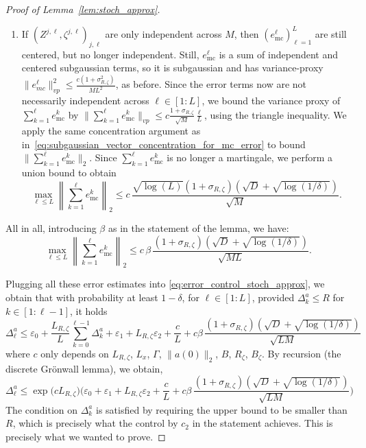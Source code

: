 \documentclass[a4paper,11pt]{article}
\newcommand{\1}{\mathbbm{1}}
\theoremstyle{definition}
\theoremstyle{remark}
\begin{document}
\begin{proof}[Proof of Lemma~\ref{lem:stoch_approx}]
\begin{enumerate}
    \item {If $(Z^{j,\ell}, \zeta^{j,\ell})_{j,\ell}$ are only independent across $M$, then $(e^\ell_{\mathrm{mc}})_{\ell=1}^{L}$ are still centered, but no longer independent.} 
    {Still, $e^\ell_{\mathrm{mc}}$ is a sum of independent and centered subgaussian terms, so it is subgaussian and has variance-proxy $\|e^{\ell}_{mc}\|_{vp}^2 \leq \frac{c(1+\sigma_{R,\zeta}^2)}{ML^2}$, as before. 
    Since the error terms now are not necessarily independent across $\ell\in[1:L]$, we bound the variance proxy of
    $\sum_{k=1}^{\ell} e^k_{\mathrm{mc}}$ by $\|\sum_{k=1}^{\ell} e^k_{\mathrm{mc}} \|_{vp} \leq c\frac{1+\sigma_{R{,\zeta}}}{\sqrt{M}}\frac{\ell}{L}$, using the triangle inequality. We apply the same concentration argument as in~\eqref{eq:subgaussian_vector_concentration_for_mc_error} to bound \(\big\| \sum_{k=1}^{\ell} e^k_{\mathrm{mc}} \big\|_2\). Since $\sum_{k=1}^{\ell} e^k_{\mathrm{mc}}$ is no longer a martingale, we perform a union bound to obtain} 
    \begin{equation}\label{eq:subgaussian_vector_concentration_for_mc_error_shared_in_L}
    \max_{\ell \leq L}\left\| \sum_{k=1}^{\ell} e^k_{\mathrm{mc}} \right\|_2
  \leq c\, \frac{{\sqrt{\log(L)}}(1+\sigma_{R{,\zeta}})(\sqrt{D} + \sqrt{\log(1/\delta)})}{\sqrt{M}}.
\end{equation}
\end{enumerate}
{All in all, introducing $\beta$ as in the statement of the lemma, we have:
\begin{equation}\label{eq:subgaussian_vector_concentration_for_mc_error_all}
    \max_{\ell \leq L}\left\| \sum_{k=1}^{\ell} e^k_{\mathrm{mc}} \right\|_2
  \leq c\, {\beta}\,\frac{(1+\sigma_{R{,\zeta}})(\sqrt{D} + \sqrt{\log(1/\delta)})}{\sqrt{ML}}.
\end{equation}}


Plugging all these error estimates into \eqref{eq:error_control_stoch_approx}, we obtain that with probability at
least $1 - \delta$, for $\ell \in [1:L]$, provided $\Delta^a_k \leq R$ for
$k \in [1:\ell-1]$, it holds
\[
  \Delta^a_\ell
  \leq \varepsilon_0 + \frac{L_{R{,\zeta}}}{L} \sum_{k=0}^{\ell-1} \Delta^a_k
  + \varepsilon_1+ L_{R{,\zeta}} \varepsilon_2
  + \frac{c}{L}
  + c\beta\, \frac{{(1+\sigma_{R{,\zeta}})}(\sqrt{D} + \sqrt{\log(1/\delta)})}{\sqrt{LM}}
\]
where $c$ only depends on $L_{R{,\zeta}}$, $L_{{x}}$, $\Gamma$, $\|a(0)\|_2$, $B$, $R_\zeta$, $B_\zeta$. 
By
recursion (the discrete Gr\"onwall lemma),
we obtain,
\[\Delta^a_\ell
  \leq \exp\Big(cL_{R{,\zeta}} \Big) \Big(\varepsilon_0 + \varepsilon_1+ L_{R,\zeta} \varepsilon_2
  + \frac{c}{L}
  + c\beta\, \frac{{(1+\sigma_{R{,\zeta}})}(\sqrt{D} + \sqrt{\log(1/\delta)})}{\sqrt{LM}}\Big)\]
The condition on $\Delta^a_k$ is satisfied
by requiring the upper bound to be smaller than $R$, which is precisely what the control
by $c_2$ in the statement achieves. This is precisely what we wanted to prove.
\end{proof}
\end{document}
